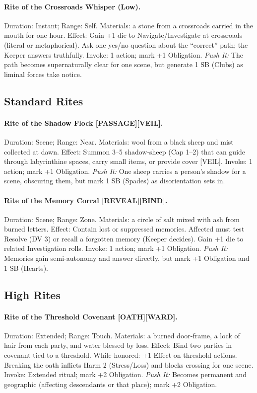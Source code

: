 \paragraph{Rite of the Crossroads Whisper (Low).} Duration: Instant; Range: Self.  
Materials: a stone from a crossroads carried in the mouth for one hour.  
Effect: Gain +1 die to Navigate/Investigate at crossroads (literal or metaphorical). Ask one yes/no question about the ``correct'' path; the Keeper answers truthfully.  
Invoke: 1 action; mark +1 Obligation.  
\emph{Push It:} The path becomes supernaturally clear for one scene, but generate 1 SB (Clubs) as liminal forces take notice.

\subsection*{Standard Rites}
\paragraph{Rite of the Shadow Flock [PASSAGE][VEIL].} Duration: Scene; Range: Near.  
Materials: wool from a black sheep and mist collected at dawn.  
Effect: Summon 3--5 shadow-sheep (Cap 1--2) that can guide through labyrinthine spaces, carry small items, or provide cover [VEIL].  
Invoke: 1 action; mark +1 Obligation.  
\emph{Push It:} One sheep carries a person's shadow for a scene, obscuring them, but mark 1 SB (Spades) as disorientation sets in.

\paragraph{Rite of the Memory Corral [REVEAL][BIND].} Duration: Scene; Range: Zone.  
Materials: a circle of salt mixed with ash from burned letters.  
Effect: Contain lost or suppressed memories. Affected must test Resolve (DV 3) or recall a forgotten memory (Keeper decides). Gain +1 die to related Investigation rolls.  
Invoke: 1 action; mark +1 Obligation.  
\emph{Push It:} Memories gain semi-autonomy and answer directly, but mark +1 Obligation and 1 SB (Hearts).

\subsection*{High Rites}
\paragraph{Rite of the Threshold Covenant [OATH][WARD].} Duration: Extended; Range: Touch.  
Materials: a burned door-frame, a lock of hair from each party, and water blessed by loss.  
Effect: Bind two parties in covenant tied to a threshold. While honored: +1 Effect on threshold actions. Breaking the oath inflicts Harm 2 (Stress/Loss) and blocks crossing for one scene.  
Invoke: Extended ritual; mark +2 Obligation.  
\emph{Push It:} Becomes permanent and geographic (affecting descendants or that place); mark +2 Obligation.  

